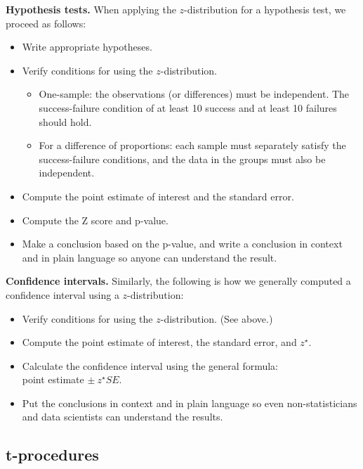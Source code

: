 \documentclass[
  10pt,
  openany]{book}
\providecommand{\tightlist}{%
  \setlength{\itemsep}{0pt}\setlength{\parskip}{0pt}}
\begin{document}
\clearpage

\textbf{Hypothesis tests.} When applying the \(z\)-distribution for a hypothesis test, we proceed as follows:

\begin{itemize}
\item
  Write appropriate hypotheses.
\item
  Verify conditions for using the \(z\)-distribution.

  \begin{itemize}
  \tightlist
  \item
    One-sample: the observations (or differences) must be independent. The success-failure condition of at least 10 success and at least 10 failures should hold.
  \item
    For a difference of proportions: each sample must separately satisfy the success-failure conditions, and the data in the groups must also be independent.
  \end{itemize}
\item
  Compute the point estimate of interest and the standard error.
\item
  Compute the Z score and p-value.
\item
  Make a conclusion based on the p-value, and write a conclusion in context and in plain language so anyone can understand the result.
\end{itemize}

\textbf{Confidence intervals.} Similarly, the following is how we generally computed a confidence interval using a \(z\)-distribution:

\begin{itemize}
\tightlist
\item
  Verify conditions for using the \(z\)-distribution. (See above.)
\item
  Compute the point estimate of interest, the standard error, and \(z^{\star}.\)
\item
  Calculate the confidence interval using the general formula:\\
  point estimate \(\pm\ z^{\star} SE.\)
\item
  Put the conclusions in context and in plain language so even non-statisticians and data scientists can understand the results.
\end{itemize}

\hypertarget{t-procedures}{%
\subsection{t-procedures}\label{t-procedures}}
\end{document}
